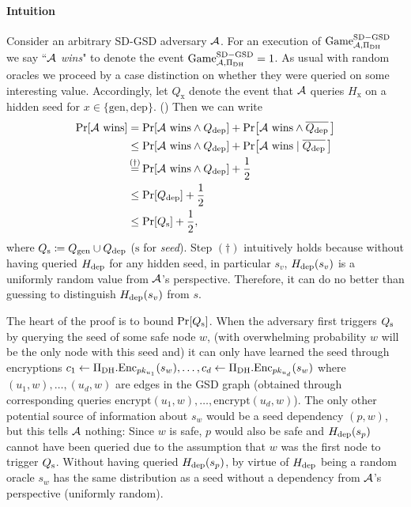 \paragraph{Intuition}
Consider an arbitrary SD-GSD adversary $\mathcal{A}$. For an execution of $\mathrm{Game}_{\mathcal{A}, \Pi_{\mathrm{DH}}}^{\mathrm{SD-GSD}}$ we say ``\emph{$\mathcal{A}$ wins}" to denote the event $\mathrm{Game}_{\mathcal{A}, \Pi_{\mathrm{DH}}}^{\mathrm{SD-GSD}} = 1$.
As usual with random oracles we proceed by a case distinction on whether they were queried on some interesting value. Accordingly, let $Q_{\mathrm{x}}$ denote the event that $\mathcal{A}$ queries $H_{\mathrm{x}}$ on a hidden seed for $x \in \{\mathrm{gen}, \mathrm{dep}\}$. () Then we can write
\begin{align} \label{eq:theorem-sd-gsd-security-win-cases}
	\begin{split}
		\pr{\wins} & = \pr{\wins \land \qdep} + \pr{\wins \land \overline{\qdep} \,} \\
		& \le \pr{\wins \land \qdep} + \pr{\wins \mid \overline{\qdep} \,} \\
		& \stackrel{\mathclap{(\dagger)}}{=}  \pr{\wins \land \qdep} + \frac{1}{2}         \\
		& \le \pr{\qdep} + \frac{1}{2} \\
		& \le \pr{\qs} + \frac{1}{2},
	\end{split}
\end{align}
where $Q_\mathrm{s} \coloneqq Q_\mathrm{gen} \cup Q_\mathrm{dep}$ ($\mathrm{s}$ for \emph{seed}). Step $(\dagger)$ intuitively holds because without having queried $H_\mathrm{dep}$ for any hidden seed, in particular $s_v$, $H_\mathrm{dep}(s_v)$ is a uniformly random value from $\mathcal{A}$'s perspective. Therefore, it can do no better than guessing to distinguish $H_\mathrm{dep}(s_v)$ from $s$.


The heart of the proof is to bound $\pr{\qs}$. When the adversary first triggers $Q_\mathrm{s}$ by querying the seed of some safe node $w$, (with overwhelming probability $w$ will be the only node with this seed and) it can only have learned the seed through encryptions
$c_1 \leftarrow \Pi_{\mathrm{DH}}.\mathrm{Enc}_{pk_{u_1}}(s_w), \ldots, c_d \leftarrow \Pi_{\mathrm{DH}}.\mathrm{Enc}_{pk_{u_d}}(s_w)$
where $(u_1, w), \ldots, (u_d, w)$ are edges in the GSD graph (obtained through corresponding queries $\mathrm{encrypt}(u_1, w), \ldots, \mathrm{encrypt}(u_d, w)$). The only other potential source of information about $s_w$ would be a seed dependency $(p, w)$, but this tells $\mathcal{A}$ nothing: Since $w$ is safe, $p$ would also be safe and $H_\mathrm{dep}(s_p)$ cannot have been queried due to the assumption that $w$ was the first node to trigger $Q_\mathrm{s}$. Without having queried $H_\mathrm{dep}(s_p)$, by virtue of $H_\mathrm{dep}$ being a random oracle $s_w$ has the same distribution as a seed without a dependency from $\mathcal{A}$'s perspective (uniformly random).

